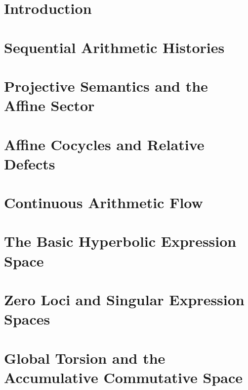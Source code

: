\documentclass[11pt]{article}
\theoremstyle{definition}
\theoremstyle{remark}
\begin{document}
\setcounter{tocdepth}{2}
\tableofcontents
\newpage

\section{Introduction}\label{sec:introduction}


\section{Sequential Arithmetic Histories}\label{sec:sequential-histories}


\section{Projective Semantics and the Affine Sector}\label{sec:projective-affine}


\section{Affine Cocycles and Relative Defects}\label{sec:affine-cocycles}


\section{Continuous Arithmetic Flow}\label{sec:affine-flow}


\section{The Basic Hyperbolic Expression Space}\label{sec:hyperbolic-model}


\section{Zero Loci and Singular Expression Spaces}\label{sec:zero-geometry}


\section{Global Torsion and the Accumulative Commutative Space}\label{sec:acs-torsion}

\end{document}

